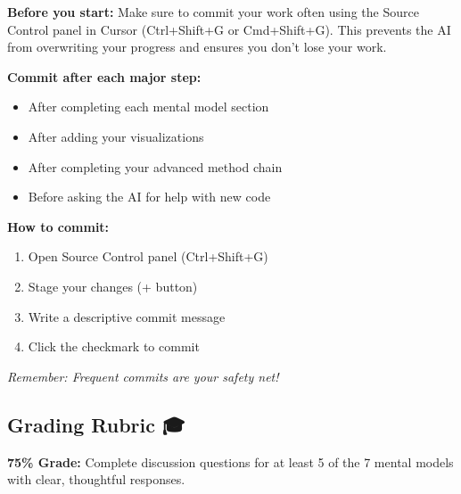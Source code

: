 \documentclass[
  letterpaper,
  DIV=11,
  numbers=noendperiod]{scrartcl}
\providecommand{\tightlist}{%
  \setlength{\itemsep}{0pt}\setlength{\parskip}{0pt}}
\begin{document}
\begin{tcolorbox}[enhanced jigsaw, toptitle=1mm, opacityback=0, colframe=quarto-callout-warning-color-frame, leftrule=.75mm, arc=.35mm, opacitybacktitle=0.6, breakable, titlerule=0mm, coltitle=black, bottomtitle=1mm, title=\textcolor{quarto-callout-warning-color}{\faExclamationTriangle}\hspace{0.5em}{💾 Important: Save Your Work Frequently!}, colbacktitle=quarto-callout-warning-color!10!white, rightrule=.15mm, left=2mm, bottomrule=.15mm, toprule=.15mm, colback=white]

\textbf{Before you start:} Make sure to commit your work often using the
Source Control panel in Cursor (Ctrl+Shift+G or Cmd+Shift+G). This
prevents the AI from overwriting your progress and ensures you don't
lose your work.

\textbf{Commit after each major step:}

\begin{itemize}
\tightlist
\item
  After completing each mental model section
\item
  After adding your visualizations
\item
  After completing your advanced method chain
\item
  Before asking the AI for help with new code
\end{itemize}

\textbf{How to commit:}

\begin{enumerate}
\def\labelenumi{\arabic{enumi}.}
\tightlist
\item
  Open Source Control panel (Ctrl+Shift+G)
\item
  Stage your changes (+ button)
\item
  Write a descriptive commit message
\item
  Click the checkmark to commit
\end{enumerate}

\emph{Remember: Frequent commits are your safety net!}

\end{tcolorbox}

\subsection{Grading Rubric 🎓}\label{grading-rubric}

\textbf{75\% Grade:} Complete discussion questions for at least 5 of the
7 mental models with clear, thoughtful responses.
\end{document}
